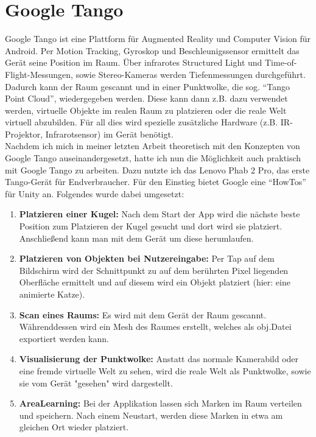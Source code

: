 
\section{Google Tango}
Google Tango ist eine Plattform für Augmented Reality und Computer Vision für Android. Per Motion Tracking, Gyroskop und Beschleunigssensor ermittelt das Gerät seine Position im Raum. Über infrarotes Structured Light und Time-of-Flight-Messungen, sowie Stereo-Kameras werden Tiefenmessungen durchgeführt. Dadurch kann der Raum gescannt und in einer Punktwolke, die sog. "`Tango Point Cloud"', wiedergegeben werden. Diese kann dann z.B. dazu verwendet werden, virtuelle Objekte im realen Raum zu platzieren oder die reale Welt virtuell abzubilden. Für all dies wird spezielle zusätzliche Hardware (z.B. IR-Projektor, Infrarotsensor) im Gerät benötigt.\cite{fehling}\\
Nachdem ich mich in meiner letzten Arbeit theoretisch mit den Konzepten von Google Tango auseinandergesetzt, hatte ich nun die Möglichkeit auch praktisch mit Google Tango zu arbeiten. Dazu nutzte ich das Lenovo Phab 2 Pro, das erste Tango-Gerät für Endverbraucher. Für den Einstieg bietet Google eine "`HowTos"' für Unity an. Folgendes wurde dabei umgesetzt:
\begin{enumerate}
	\item\textbf{Platzieren einer Kugel:} Nach dem Start der App wird die nächste beste Position zum Platzieren der Kugel gesucht und dort wird sie platziert. Anschließend kann man mit dem Gerät um diese herumlaufen.
	\item\textbf{Platzieren von Objekten bei Nutzereingabe:} Per Tap auf dem Bildschirm wird der Schnittpunkt zu auf dem berührten Pixel liegenden Oberfläche ermittelt und auf diesem wird ein Objekt platziert (hier: eine animierte Katze).
	\item\textbf{Scan eines Raums:} Es wird mit dem Gerät der Raum gescannt. Währenddessen wird ein Mesh des Raumes erstellt, welches als obj.Datei exportiert werden kann.
	\item\textbf{Visualisierung der Punktwolke:} Anstatt das normale Kamerabild oder eine fremde virtuelle Welt zu sehen, wird die reale Welt als Punktwolke, sowie sie vom Gerät "gesehen" wird dargestellt.
	\item\textbf{AreaLearning:} Bei der Applikation lassen sich Marken im Raum verteilen und speichern. Nach einem Neustart, werden diese Marken in etwa am gleichen Ort wieder platziert.
\end{enumerate}
